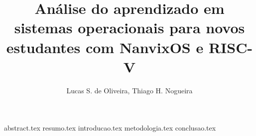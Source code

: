 \documentclass[12pt]{article}
\title{Análise do aprendizado em sistemas operacionais para novos estudantes com NanvixOS e RISC-V
}
\author{Lucas S. de Oliveira\inst{1}, Thiago H. Nogueira\inst{1}}
\begin{document}
    \maketitle

    {abstract.tex}
    {resumo.tex}
    {introducao.tex}
    {metodologia.tex}
    {conclusao.tex}
    
    
    
\end{document}

